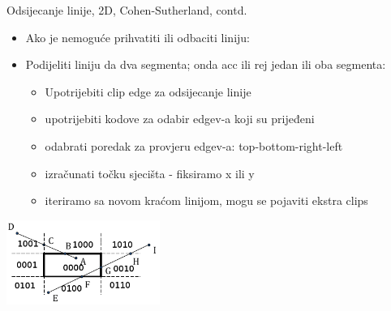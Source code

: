 \documentclass[9pt]{beamer}
\begin{document}
\begin{frame}{Odsijecanje linije, 2D, Cohen-Sutherland, contd.}
	\begin{itemize}
		\item Ako je nemoguće prihvatiti ili odbaciti liniju:
		\item Podijeliti liniju da dva segmenta; onda acc ili rej jedan ili oba segmenta:
		\begin{itemize}
			\item Upotrijebiti clip edge za odsijecanje linije
			\item upotrijebiti kodove za odabir edgev-a koji su prijeđeni
			\item odabrati poredak za provjeru edgev-a: top-bottom-right-left
			\item izračunati točku sjecišta - fiksiramo x ili y
			\item iteriramo sa novom kraćom linijom, mogu se pojaviti ekstra clips
		\end{itemize}
	\end{itemize}
	\begin{center}
		\includegraphics[width=5cm]{slike/clip_rect_2.png}
	\end{center}
\end{frame}
\end{document}
